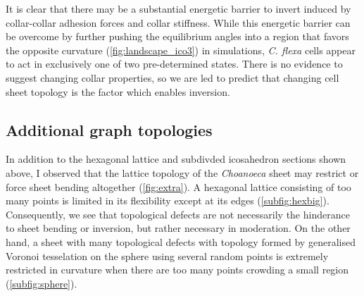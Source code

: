 It is clear that there may be a substantial energetic barrier to invert induced by collar-collar adhesion forces and collar stiffness. 
While this energetic barrier can be overcome by further pushing the equilibrium angles into a region that favors the opposite curvature (\cref{fig:landscape_ico3}) in simulations, \textit{C. flexa} cells appear to act in exclusively one of two pre-determined states.
There is no evidence to suggest changing collar properties, so we are led to predict that changing cell sheet topology is the factor which enables inversion.

\subsection{Additional graph topologies}

In addition to the hexagonal lattice and subdivded icosahedron sections shown above, I observed that the lattice topology of the \textit{Choanoeca} sheet may restrict or force sheet bending altogether (\cref{fig:extra}).
A hexagonal lattice consisting of too many points is limited in its flexibility except at its edges (\cref{subfig:hexbig}). 
Consequently, we see that topological defects are not necessarily the hinderance to sheet bending or inversion, but rather necessary in moderation.
On the other hand, a sheet with many topological defects with topology formed by generalised Voronoi tesselation on the sphere using several random points is extremely restricted in curvature when there are too many points crowding a small region (\cref{subfig:sphere}).

